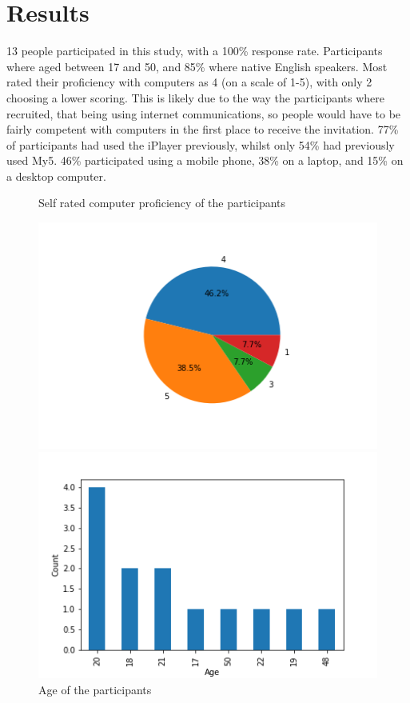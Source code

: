 \documentclass[12pt,a4paper,x11names]{article}
\begin{document}
\section{Results}
13 people participated in this study, with a 100\% response rate. Participants where aged between 17 and 50, and 85\% where native English speakers. Most rated their proficiency with computers as 4 (on a scale of 1-5), with only 2 choosing a lower scoring. This is likely due to the way the participants where recruited, that being using internet communications, so people would have to be fairly competent with computers in the first place to receive the invitation. 77\% of participants had used the iPlayer previously, whilst only 54\% had previously used My5. 46\% participated using a mobile phone, 38\% on a laptop, and 15\% on a desktop computer. 

\begin{figure}[!h]
\begin{minipage}[c]{.5\linewidth}
\caption{Self rated computer proficiency of the participants}
\centering
\includegraphics[width=\textwidth]{plots/proficiency.png}
\end{minipage}
\hfill
\begin{minipage}[c]{.5\linewidth}
\caption{Age of the participants}
\centering
\includegraphics[width=\textwidth]{plots/age.png}
\end{minipage}
\end{figure}
\end{document}

